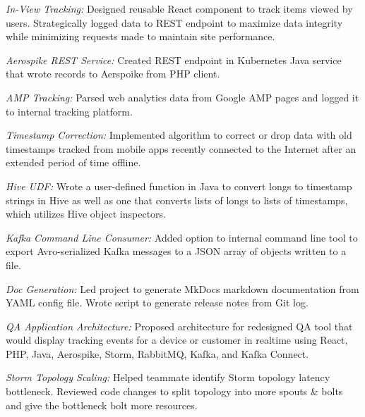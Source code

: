 \documentclass[letterpaper,11pt]{article}
\begin{document}
      \item{{\slshape In-View Tracking:} Designed reusable React component to track items viewed by users. Strategically logged data to REST endpoint to maximize data integrity while minimizing requests made to maintain site performance.}
      \vspace{-5pt}
      \item{{\slshape Aerospike REST Service:} Created REST endpoint in Kubernetes Java service that wrote records to Aerspoike from PHP client.}
      \vspace{-5pt}
      \item{{\slshape AMP Tracking:} Parsed web analytics data from Google AMP pages and logged it to internal tracking platform.}
      \vspace{-5pt}
      \item{{\slshape Timestamp Correction:} Implemented algorithm to correct or drop data with old timestamps tracked from mobile apps recently connected to the Internet after an extended period of time offline.}
      \vspace{-5pt}
      \item{{\slshape Hive UDF:} Wrote a user-defined function in Java to convert longs to timestamp strings in Hive as well as one that converts lists of longs to lists of timestamps, which utilizes Hive object inspectors.}
      \vspace{-5pt}
      \item{{\slshape Kafka Command Line Consumer:} Added option to internal command line tool to export Avro-serialized Kafka messages to a JSON array of objects written to a file.}
      \vspace{-5pt}
      \item{{\slshape Doc Generation:} Led project to generate MkDocs markdown documentation from YAML config file. Wrote script to generate release notes from Git log.}
      \vspace{-5pt}
      \item{{\slshape QA Application Architecture:} Proposed architecture for redesigned QA tool that would display tracking events for a device or customer in realtime using React, PHP, Java, Aerospike, Storm, RabbitMQ, Kafka, and Kafka Connect.}
      \vspace{-5pt}
      \item{{\slshape Storm Topology Scaling:} Helped teammate identify Storm topology latency bottleneck. Reviewed code changes to split topology into more spouts \& bolts and give the bottleneck bolt more resources.}
\end{document}

